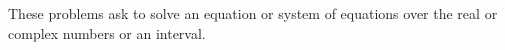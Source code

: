 These problems ask to solve an equation or system of equations over the real or complex numbers or an interval.
